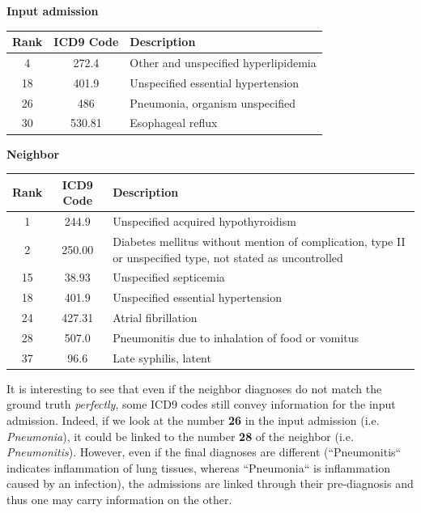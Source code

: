 \begin{table}[H]
 \begin{center}
  \textbf{Input admission} \\
  
  \begin{tabular}{| c | c | p{8cm} |}
   \hline
   \textbf{Rank} & \textbf{ICD9 Code} & \textbf{Description} \\ \hline
   4 & 272.4 & Other and unspecified hyperlipidemia  \\ \hline
   18 & 401.9 & Unspecified essential hypertension \\ \hline
   26 & 486 & Pneumonia, organism unspecified \\ \hline
   30 & 530.81 & Esophageal reflux \\ \hline
  \end{tabular}
 \end{center}
\end{table}
\begin{table}[H]
 \begin{center}
  \textbf{Neighbor} \\
  
  \begin{tabular}{| c | c | p{8cm} |}
   \hline
   \textbf{Rank} & \textbf{ICD9 Code} & \textbf{Description} \\ \hline
   1 & 244.9 & Unspecified acquired hypothyroidism \\ \hline
   2 & 250.00 & Diabetes mellitus without mention of complication, type II or unspecified type, not stated as uncontrolled \\ \hline
   15 & 38.93 & Unspecified septicemia \\ \hline
   18 & 401.9 & Unspecified essential hypertension \\ \hline
   24 & 427.31 & Atrial fibrillation \\ \hline
   28 & 507.0 & Pneumonitis due to inhalation of food or vomitus \\ \hline
   37 & 96.6 & Late syphilis, latent \\ \hline
  \end{tabular}
 \end{center}
\end{table}

It is interesting to see that even if the neighbor diagnoses do not match the ground truth \textit{perfectly}, some ICD9 codes still convey information for the input admission. Indeed, if we look at the number \textbf{26} in the input admission (i.e. \textit{Pneumonia}), it could be linked to the number \textbf{28} of the neighbor (i.e. \textit{Pneumonitis}). However, even if the final diagnoses are different (``Pneumonitis`` indicates inflammation of lung tissues, whereas ``Pneumonia`` is inflammation caused by an infection), the admissions are linked through their pre-diagnosis and thus one may carry information on the other. \\

